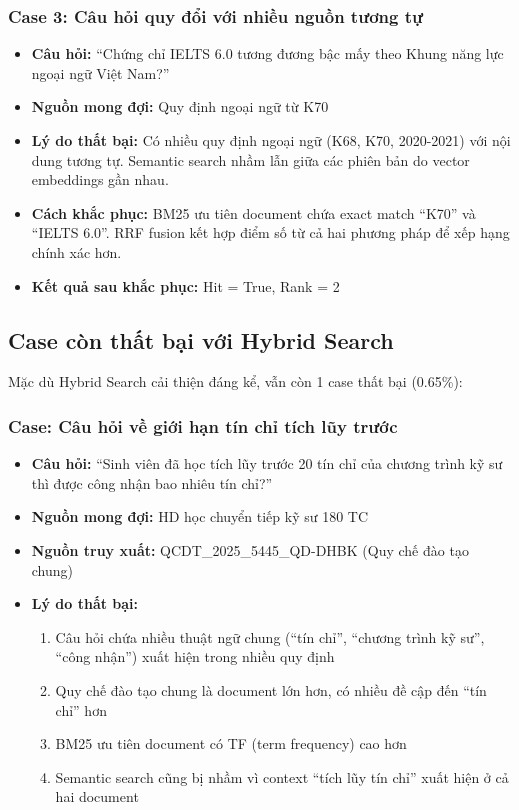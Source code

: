 \documentclass[../DoAn.tex]{subfiles}
\begin{document}
\subsubsection{Case 3: Câu hỏi quy đổi với nhiều nguồn tương tự}
\begin{itemize}
    \item \textbf{Câu hỏi:} ``Chứng chỉ IELTS 6.0 tương đương bậc mấy theo Khung năng lực ngoại ngữ Việt Nam?''
    \item \textbf{Nguồn mong đợi:} Quy định ngoại ngữ từ K70
    \item \textbf{Lý do thất bại:} Có nhiều quy định ngoại ngữ (K68, K70, 2020-2021) với nội dung tương tự. Semantic search nhầm lẫn giữa các phiên bản do vector embeddings gần nhau.
    \item \textbf{Cách khắc phục:} BM25 ưu tiên document chứa exact match ``K70'' và ``IELTS 6.0''. RRF fusion kết hợp điểm số từ cả hai phương pháp để xếp hạng chính xác hơn.
    \item \textbf{Kết quả sau khắc phục:} Hit = True, Rank = 2
\end{itemize}

\subsection{Case còn thất bại với Hybrid Search}

Mặc dù Hybrid Search cải thiện đáng kể, vẫn còn 1 case thất bại (0.65\%):

\subsubsection{Case: Câu hỏi về giới hạn tín chỉ tích lũy trước}
\begin{itemize}
    \item \textbf{Câu hỏi:} ``Sinh viên đã học tích lũy trước 20 tín chỉ của chương trình kỹ sư thì được công nhận bao nhiêu tín chỉ?''
    \item \textbf{Nguồn mong đợi:} HD học chuyển tiếp kỹ sư 180 TC
    \item \textbf{Nguồn truy xuất:} QCDT\_2025\_5445\_QD-DHBK (Quy chế đào tạo chung)
    \item \textbf{Lý do thất bại:}
    \begin{enumerate}
        \item Câu hỏi chứa nhiều thuật ngữ chung (``tín chỉ'', ``chương trình kỹ sư'', ``công nhận'') xuất hiện trong nhiều quy định
        \item Quy chế đào tạo chung là document lớn hơn, có nhiều đề cập đến ``tín chỉ'' hơn
        \item BM25 ưu tiên document có TF (term frequency) cao hơn
        \item Semantic search cũng bị nhầm vì context ``tích lũy tín chỉ'' xuất hiện ở cả hai document
    \end{enumerate}
\end{itemize}
\end{document}
